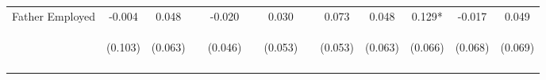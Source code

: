 \begin{tabular}{lcccccccccccc}
\noalign{\smallskip}Father Employed & -0.004 & 0.048 &  & -0.020 &  & 0.030 &  & 0.073 & 0.048 & 0.129* & -0.017 & 0.049\\
 & \begin{footnotesize}(0.103)\end{footnotesize} & \begin{footnotesize}(0.063)\end{footnotesize} & \begin{footnotesize}\end{footnotesize} & \begin{footnotesize}(0.046)\end{footnotesize} & \begin{footnotesize}\end{footnotesize} & \begin{footnotesize}(0.053)\end{footnotesize} & \begin{footnotesize}\end{footnotesize} & \begin{footnotesize}(0.053)\end{footnotesize} & \begin{footnotesize}(0.063)\end{footnotesize} & \begin{footnotesize}(0.066)\end{footnotesize} & \begin{footnotesize}(0.068)\end{footnotesize} & \begin{footnotesize}(0.069)\end{footnotesize}\\
\noalign{\smallskip}\hline\end{tabular}\\
